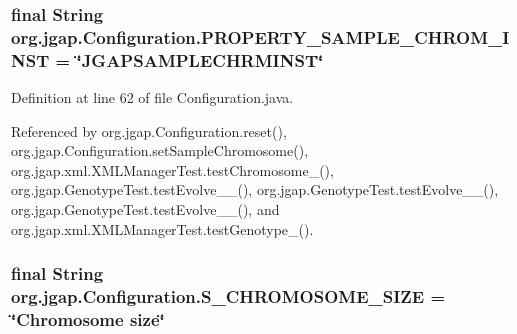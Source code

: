 \hypertarget{classorg_1_1jgap_1_1_configuration_afc9eba3b76b27ad2adf5afada25020e0}{
\subsubsection[{P\-R\-O\-P\-E\-R\-T\-Y\-\_\-\-S\-A\-M\-P\-L\-E\-\_\-\-C\-H\-R\-O\-M\-\_\-\-I\-N\-S\-T}]{\setlength{\rightskip}{0pt plus 5cm}final String org.\-jgap.\-Configuration.\-P\-R\-O\-P\-E\-R\-T\-Y\-\_\-\-S\-A\-M\-P\-L\-E\-\_\-\-C\-H\-R\-O\-M\-\_\-\-I\-N\-S\-T = \char`\"{}J\-G\-A\-P\-S\-A\-M\-P\-L\-E\-C\-H\-R\-M\-I\-N\-S\-T\char`\"{}\hspace{0.3cm}{\ttfamily [static]}}}\label{classorg_1_1jgap_1_1_configuration_afc9eba3b76b27ad2adf5afada25020e0}


Definition at line 62 of file Configuration.\-java.



Referenced by org.\-jgap.\-Configuration.\-reset(), org.\-jgap.\-Configuration.\-set\-Sample\-Chromosome(), org.\-jgap.\-xml.\-X\-M\-L\-Manager\-Test.\-test\-Chromosome\-\_(), org.\-jgap.\-Genotype\-Test.\-test\-Evolve\-\_\-\_(), org.\-jgap.\-Genotype\-Test.\-test\-Evolve\-\_\-\_(), org.\-jgap.\-Genotype\-Test.\-test\-Evolve\-\_\-\_(), and org.\-jgap.\-xml.\-X\-M\-L\-Manager\-Test.\-test\-Genotype\-\_().

\hypertarget{classorg_1_1jgap_1_1_configuration_aef9249c172571664f5eada2b87580853}{
\subsubsection[{S\-\_\-\-C\-H\-R\-O\-M\-O\-S\-O\-M\-E\-\_\-\-S\-I\-Z\-E}]{\setlength{\rightskip}{0pt plus 5cm}final String org.\-jgap.\-Configuration.\-S\-\_\-\-C\-H\-R\-O\-M\-O\-S\-O\-M\-E\-\_\-\-S\-I\-Z\-E = \char`\"{}Chromosome size\char`\"{}\hspace{0.3cm}{\ttfamily [static]}}}\label{classorg_1_1jgap_1_1_configuration_aef9249c172571664f5eada2b87580853}


